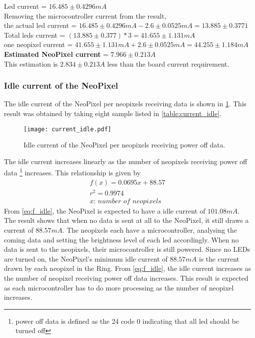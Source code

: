{
	\centering
	Led current = $16.485 \pm 0.4296 mA$ \\
	Removing the microcontroller current from the result,\\ the actual led current = $16.485 \pm 0.4296 mA - 2.6 \pm 0.0525 mA = 13.885 \pm 0.3771$  \\
	Total leds current = $(13.885 \pm 0.377)*3 = 41.655 \pm 1.131 mA$  \\
	one neopixel current = $41.655 \pm 1.131 mA + 2.6 \pm 0.0525 mA  = 44.255 \pm 1.184 mA $\\
	\textbf{Estimated NeoPixel current} = $7.966 \pm 0.213 A$\\
}
This estimation is $2.834\pm0.213A$ less than the board current requirement.

\subsubsection{Idle current of the NeoPixel}\label{idle_current}
The idle current of the NeoPixel per neopixels receiving data is shown in \cref{fig:current_idle}. This result was obtained by taking eight sample listed in \cref{table:current_idle}. 
\begin{figure}[ht]
	\centering
	\texttt{[image: current\_idle.pdf]}
	\caption{Idle current of the NeoPixel per neopixels receiving power off data.}
	\label{fig:current_idle}
\end{figure}
The idle current increases linearly as the number of neopixels receiving power off data \footnote{power off data is defined as the 24 code 0 indicating that all led should be turned off} increases. This relationship is given by 
\begin{equation}
\label{eq:f_idle}
\begin{multlined}
f(x) = 0.0695x+88.57 \\
r^2 = 0.9974\\
\textit{$x$: number of neopixels}
\end{multlined}
\end{equation} 
From \cref{eq:f_idle}, the NeoPixel is expected to have a idle current of $101.08mA$. The result shows that when no data is sent at all to the NeoPixel, it still draws a current of $88.57mA$. The neopixels each have a microcontroller, analysing the coming data and setting the brightness level of each led accordingly. When no data is sent to the neopixels, their microcontroller is still powered. Since no LEDs are turned on, the NeoPixel's minimum idle current of $88.57mA$ is the current drawn by each neopixel in the Ring. From \cref{eq:f_idle}, the idle current increases as the number of neopixel receiving power off data increases. This result is expected as each microcontroller has to do more processing as the number of neopixel increases. 

